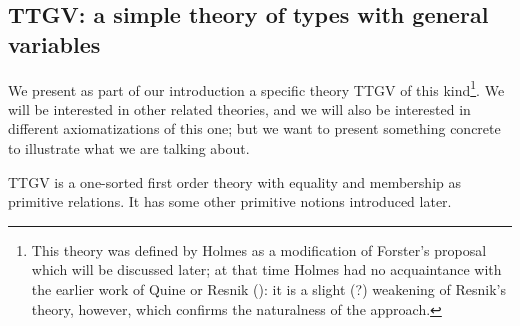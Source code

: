 \documentclass[12pt]{article}
\begin{document}
\subsection{TTGV:  a simple theory of types with general variables}

We present as part of our introduction a specific theory TTGV of this
kind\footnote{This theory was defined by Holmes as a modification of Forster's proposal which will be discussed later; at that time Holmes had no acquaintance with the earlier work of Quine or Resnik (\cite{resnikttgv}):  it is a slight (?) weakening of Resnik's theory, however, which confirms the naturalness of the approach.}.  We will be interested in other related theories, and we will
also be interested in different axiomatizations of this one; but we
want to present something concrete to illustrate what we are talking
about.

TTGV is a one-sorted first order theory with equality and membership as primitive relations.  It has some other primitive notions introduced later.
\end{document}
